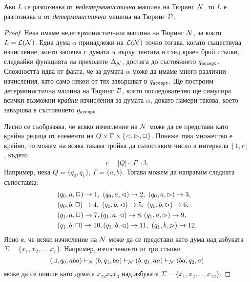 \begin{framed}
  \begin{thm}
    Ако $L$ се разпознава от {\em недетерминистична} машина на Тюринг $\mathcal{N}$, то $L$
    е разпознава и от {\em детерминистична} машина на Тюринг $\mathcal{D}$.
  \end{thm}
\end{framed}
\begin{proof}
  Нека имаме недетерминистичната машина на Тюринг $\mathcal{N}$, за която $L = \mathcal{L}(\mathcal{N})$.
  Една дума $\alpha$ принадлежи на $\mathcal{L}(\mathcal{N})$ точно тогава, когато съществува изчисление,
  което започва с думата $\alpha$ върху лентата и след краен брой стъпки, следвайки функцията на преходите $\Delta_{\mathcal{N}}$,
  достига до състоянието $q_{\texttt{accept}}$.
  Сложността идва от факта, че за думата $\alpha$ може да имаме много различни изчисления, 
  като само някои от тях завършват в $q_{\texttt{accept}}$. Ще построим детерминистична машина на Тюринг $\mathcal{D}$,
  която последователно ще симулира всички възможни {\em крайни} изчисления за думата $\alpha$, докато 
  намери такова, което завършва в състоянието $q_{\texttt{accept}}$.
  
  Лесно се съобразява, че всяко изчисление на $\mathcal{N}$ може да се представи като 
  крайна редица от елементи на $Q \times \Gamma \times \{\lhd,\rhd,\Box\}$.
  Понеже това множество е крайно, то можем на всяка такава тройка да
  съпоставим число в интервала $[1,r]$, където 
  \[r = |Q| \cdot |\Gamma| \cdot 3.\]
  Например, нека $Q = \{q_0,q_1\}$, $\Gamma = \{a,b\}$. Тогава можем да направим следната съпоставка:
  \begin{align*}
    & (q_0,a,\stay) \to 1,\ (q_0,a,\goleft) \to 2,\ (q_0,a,\goright) \to 3,\\
    & (q_0,b,\stay) \to 4,\ (q_0,b,\goleft) \to 5, \ (q_0,b,\goright) \to 6,\\
    & (q_1,a,\stay) \to 7, (q_1,a,\goleft) \to 8, (q_1,a,\goright) \to 9,\\
    & (q_1,b,\stay) \to 10, (q_1,b,\goleft) \to 11,\ (q_1,b,\goright) \to 12.
  \end{align*}
  Ясно е, че всяко изчисление на $\mathcal{N}$ може да се представи като дума над азбуката $\Sigma = \{x_1,x_2,\dots,x_r\}$.
  Например, изчислението от три стъпки
  \[(\sqcup,q_0,aba) \vdash_N (b,q_1,ba) \vdash_{\mathcal{N}} (b,q_1,aa) \vdash_{\mathcal{N}} (ba,q_2,a)\]
  може да се опише като думата $x_{12}x_7x_3$ над азбуката $\Sigma = \{x_1,x_2,\dots,x_{12}\}$.
  

\end{proof}
